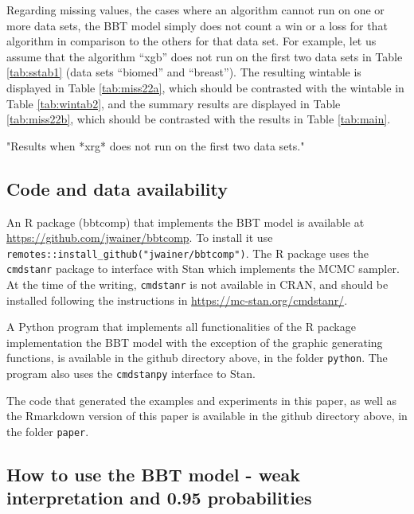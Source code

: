 \documentclass[twoside,11pt,preprint]{article}
\begin{document}
Regarding missing values, the cases where an algorithm cannot run on
one or more data sets, the BBT model simply does not count a win or a
loss for that algorithm in comparison to the others for that data
set. For example, let us assume that the algorithm ``xgb'' does not run
on the first two data sets in Table \ref{tab:sstab1} (data sets
``biomed'' and ``breast''). The resulting wintable is displayed in Table
\ref{tab:miss22a}, which should be contrasted with the wintable in
Table \ref{tab:wintab2}, and the summary results are displayed in
Table \ref{tab:miss22b}, which should be contrasted with the results
in Table \ref{tab:main}.

\begin{table}[ht]
\centering
\subfloat[Wintable]{\label{tab:miss22a}\scalebox{1.0}{}}\quad
{}
\caption{"Results when *xrg* does not run on the first two data sets."}
\label{tab:miss22}
\end{table}

\hypertarget{code-and-data-availability}{%
\subsection{\texorpdfstring{Code and data availability \label{sec:code}}{Code and data availability }}\label{code-and-data-availability}}

An R package (bbtcomp) that implements the BBT model is available at
\url{https://github.com/jwainer/bbtcomp}. To install it use
\texttt{remotes::install\_github("jwainer/bbtcomp")}. The R package uses the
\texttt{cmdstanr} package to interface with Stan which implements the MCMC
sampler. At the time of the writing, \texttt{cmdstanr} is not available in
CRAN, and should be installed following the instructions in
\url{https://mc-stan.org/cmdstanr/}.

A Python program that implements all functionalities of the R package
implementation the BBT model with the exception of the graphic
generating functions, is available in the github directory above, in
the folder \texttt{python}. The program also uses the \texttt{cmdstanpy} interface to Stan.

The code that generated the examples and experiments in this paper, as
well as the Rmarkdown version of this paper is available in the github
directory above, in the folder \texttt{paper}.

\hypertarget{how-to-use-the-bbt-model---weak-interpretation-and-0.95-probabilities}{%
\subsection{How to use the BBT model - weak interpretation and 0.95 probabilities}\label{how-to-use-the-bbt-model---weak-interpretation-and-0.95-probabilities}}
\end{document}
